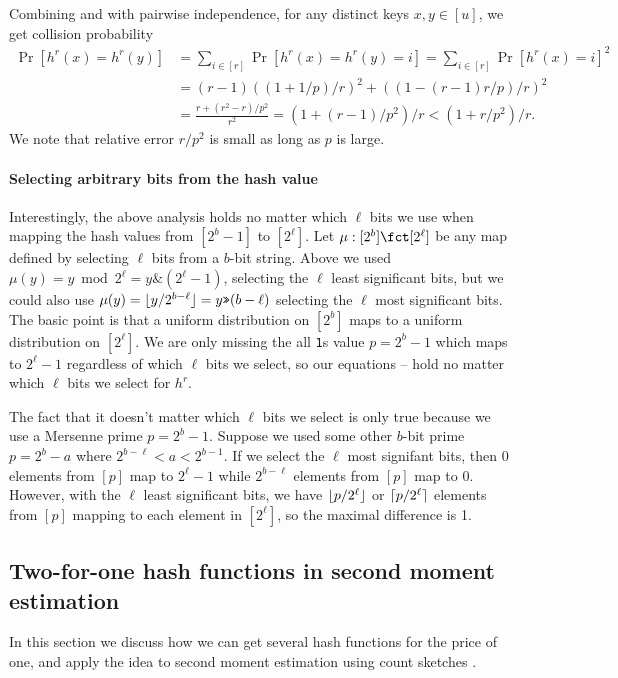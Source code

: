 Combining  and  with
pairwise independence, for any distinct keys $x,y\in [u]$, we get
collision probability
\begin{align}
  \Pr[h^r(x)=h^r(y)]&=\sum_{i\in[r]}\Pr[h^r(x)=h^r(y)=i]=\sum_{i\in[r]}\Pr[h^r(x)=i]^2\nonumber\\
                   &=(r-1)((1+1/p)/r)^2+((1-(r-1)r/p)/r)^2\nonumber\\[.5ex]
  &=\frac{r +(r^2-r)/p^2}{r^2}=(1+(r-1)/p^2)/r<(1+r/p^2)/r.\label{eq:coll}
  \end{align}
We note that relative error $r/p^2$ is small as long as $p$ is
large.

\paragraph{Selecting arbitrary bits from the hash value}
Interestingly, the above analysis holds no matter which $\ell$ bits we
use when mapping the hash values from $[2^b-1]$ to $[2^\ell]$.  Let
$\mu:[2^b]\fct[2^\ell]$ be any map defined by selecting $\ell$ bits
from a $b$-bit string. Above we used
$\mu(y)=y\bmod 2^\ell=y\texttt\& (2^\ell-1)$,
selecting the $\ell$ least significant bits, but we could
also use $\mu(y)=\lfloor {y/2^{b-\ell}} \rfloor=y\texttt{>>}(b-\ell)$ selecting
the $\ell$ most significant bits. The basic point is that a uniform
distribution on $[2^b]$ maps to a uniform distribution on
$[2^\ell]$. We are only missing the all \texttt1s value $p=2^b-1$ which maps to $2^\ell-1$
regardless of which $\ell$ bits we select, so our equations
-- hold no matter which $\ell$
bits we select for $h^r$.

The fact that it doesn't matter which $\ell$ bits we select is only
true because we use a Mersenne prime $p=2^b-1$. Suppose we used some
other $b$-bit prime $p=2^b-a$ where $2^{b-\ell}<a<2^{b-1}$. If we
select the $\ell$ most signifant bits, then $0$ elements from $[p]$
map to $2^\ell-1$ while $2^{b-\ell}$ elements from $[p]$ map to $0$. However,
with the $\ell$ least significant bits, we have $\lfloor {p/2^\ell} \rfloor$ or
$\lceil {p/2^\ell}\rceil$ elements from $[p]$ mapping to each element in
$[2^\ell]$, so the maximal difference is 1.


\subsection{Two-for-one hash functions in second moment estimation}
In this section we discuss how we can get several hash functions for
the price of one, and apply the idea to second moment estimation using
count sketches \cite{charikar04count-sketch}.

